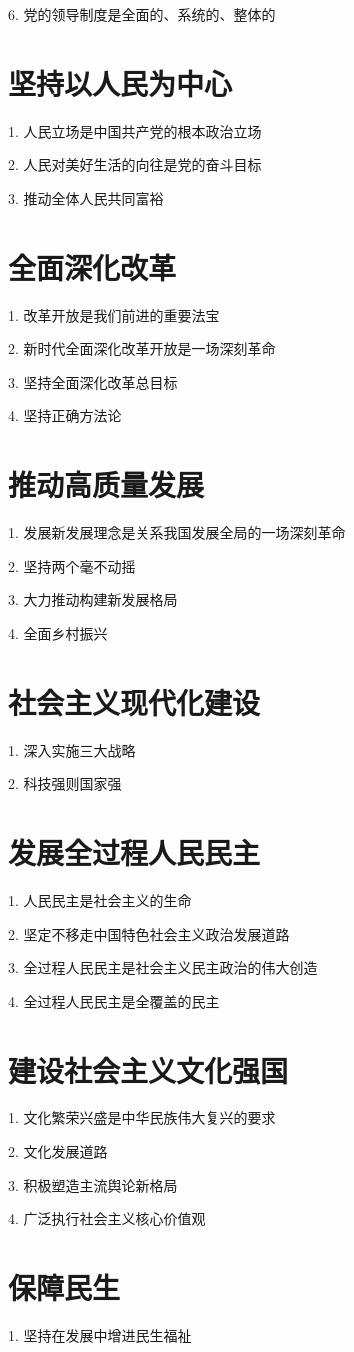 6. 党的领导制度是全面的、系统的、整体的
\section*{坚持以人民为中心}%
\label{sec*:坚持以人民为中心}
1. 人民立场是中国共产党的根本政治立场

2. 人民对美好生活的向往是党的奋斗目标

3. 推动全体人民共同富裕
\section*{全面深化改革}%
\label{sec*:全面深化改革}
1. 改革开放是我们前进的重要法宝

2. 新时代全面深化改革开放是一场深刻革命

3. 坚持全面深化改革总目标

4. 坚持正确方法论
\section*{推动高质量发展}%
\label{sec*:推动高质量发展}
1. 发展新发展理念是关系我国发展全局的一场深刻革命

2. 坚持两个毫不动摇

3. 大力推动构建新发展格局

4. 全面乡村振兴
\section*{社会主义现代化建设}%
\label{sec*:社会主义现代化建设}
1. 深入实施三大战略

2. 科技强则国家强
\section*{发展全过程人民民主}%
\label{sec*:发展全过程人民民主}
1. 人民民主是社会主义的生命

2. 坚定不移走中国特色社会主义政治发展道路

3. 全过程人民民主是社会主义民主政治的伟大创造

4. 全过程人民民主是全覆盖的民主
\section*{建设社会主义文化强国}%
\label{sec*:建设社会主义文化强国}
1. 文化繁荣兴盛是中华民族伟大复兴的要求

2. 文化发展道路

3. 积极塑造主流舆论新格局

4. 广泛执行社会主义核心价值观
\section*{保障民生}%
\label{sec*:保障民生}
1. 坚持在发展中增进民生福祉

